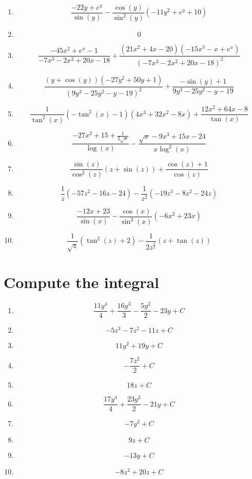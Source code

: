 \documentclass{article}
\begin{document}
        \begin{enumerate}
        \item$$\frac{- 22 y + e^{y}}{\sin{\left (y \right )}} - \frac{\cos{\left (y \right )}}{\sin^{2}{\left (y \right )}} \left(- 11 y^{2} + e^{y} + 10\right)$$
\item$$0$$
\item$$\frac{- 45 x^{2} + e^{x} - 1}{- 7 x^{3} - 2 x^{2} + 20 x - 18} + \frac{\left(21 x^{2} + 4 x - 20\right) \left(- 15 x^{3} - x + e^{x}\right)}{\left(- 7 x^{3} - 2 x^{2} + 20 x - 18\right)^{2}}$$
\item$$\frac{\left(y + \cos{\left (y \right )}\right) \left(- 27 y^{2} + 50 y + 1\right)}{\left(9 y^{3} - 25 y^{2} - y - 19\right)^{2}} + \frac{- \sin{\left (y \right )} + 1}{9 y^{3} - 25 y^{2} - y - 19}$$
\item$$\frac{1}{\tan^{2}{\left (x \right )}} \left(- \tan^{2}{\left (x \right )} - 1\right) \left(4 x^{3} + 32 x^{2} - 8 x\right) + \frac{12 x^{2} + 64 x - 8}{\tan{\left (x \right )}}$$
\item$$\frac{- 27 x^{2} + 15 + \frac{1}{2 \sqrt{x}}}{\log{\left (x \right )}} - \frac{\sqrt{x} - 9 x^{3} + 15 x - 24}{x \log^{2}{\left (x \right )}}$$
\item$$\frac{\sin{\left (z \right )}}{\cos^{2}{\left (z \right )}} \left(z + \sin{\left (z \right )}\right) + \frac{\cos{\left (z \right )} + 1}{\cos{\left (z \right )}}$$
\item$$\frac{1}{z} \left(- 57 z^{2} - 16 z - 24\right) - \frac{1}{z^{2}} \left(- 19 z^{3} - 8 z^{2} - 24 z\right)$$
\item$$\frac{- 12 x + 23}{\sin{\left (x \right )}} - \frac{\cos{\left (x \right )}}{\sin^{2}{\left (x \right )}} \left(- 6 x^{2} + 23 x\right)$$
\item$$\frac{1}{\sqrt{z}} \left(\tan^{2}{\left (z \right )} + 2\right) - \frac{1}{2 z^{\frac{3}{2}}} \left(z + \tan{\left (z \right )}\right)$$
        \end{enumerate}
        

        \section{Compute the integral}
        
        \begin{enumerate}
        \item$$\frac{11 y^{4}}{4} + \frac{16 y^{3}}{3} - \frac{5 y^{2}}{2} - 23 y + C $$
\item$$- 5 z^{3} - 7 z^{2} - 11 z + C $$
\item$$11 y^{2} + 19 y + C $$
\item$$- \frac{7 z^{2}}{2} + C $$
\item$$18 z + C $$
\item$$\frac{17 y^{4}}{4} + \frac{23 y^{2}}{2} - 21 y + C $$
\item$$- 7 y^{3} + C $$
\item$$9 z + C $$
\item$$- 13 y + C $$
\item$$- 8 z^{2} + 20 z + C $$
        \end{enumerate}
        
\end{document}
